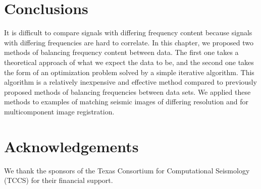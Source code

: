 
\section{Conclusions}
        It is difficult to compare signals with differing frequency content because signals with differing frequencies are hard to correlate. 
        In this chapter, we proposed two methods of balancing frequency content between data. 
        The first one takes a theoretical approach of what we expect the data to be, and the second one takes the form of an optimization problem solved by a simple iterative algorithm. 
        This algorithm is a relatively inexpensive and effective method compared to previously proposed methods of balancing frequencies between data sets. 
        We applied these methods to examples of matching seismic images of differing resolution and for multicomponent image registration.


\section{Acknowledgements}
        We thank the sponsors of the Texas Consortium for Computational Seismology (TCCS) for their financial support.
